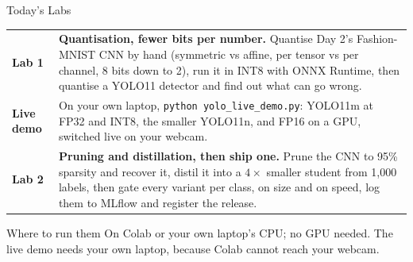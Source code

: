 \begin{frame}{Today's Labs}
    \centering
    \renewcommand{\arraystretch}{1.35}
    {\small
    \begin{tabular}{>{\raggedright\arraybackslash}p{2.3cm}>{\raggedright\arraybackslash}p{10.4cm}}
        \toprule
        \textbf{Lab 1} & \textbf{Quantisation, fewer bits per number.} Quantise Day 2's Fashion-MNIST CNN by hand
                         (symmetric vs affine, per tensor vs per channel, 8 bits down to 2), run it in INT8 with ONNX
                         Runtime, then quantise a YOLO11 detector and find out what can go wrong. \\
        \textbf{Live demo} & On your own laptop, \texttt{python yolo\_live\_demo.py}: YOLO11m at FP32 and INT8, the
                         smaller YOLO11n, and FP16 on a GPU, switched live on your webcam. \\
        \textbf{Lab 2} & \textbf{Pruning and distillation, then ship one.} Prune the CNN to 95\% sparsity and recover
                         it, distil it into a $4\times$ smaller student from 1,000 labels, then gate every variant per
                         class, on size and on speed, log them to MLflow and register the release. \\
        \bottomrule
    \end{tabular}}
    \vspace{0.6em}
    \begin{block}{Where to run them}
        On Colab or your own laptop's CPU; no GPU needed. The live demo needs your own laptop, because Colab cannot
        reach your webcam.
    \end{block}
\end{frame}
